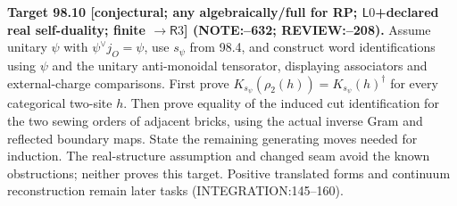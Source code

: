 \textbf{Target 98.10 [conjectural; any algebraically/full for RP; \(\mathsf L0\)+declared real self-duality; finite \(\to\mathsf R3\)] (NOTE:--632; REVIEW:--208).}
Assume unitary \(\psi\) with \(\psi^\vee j_O=\psi\), use \(s_\psi\) from 98.4, and construct word identifications
using \(\psi\) and the unitary anti-monoidal tensorator, displaying associators and external-charge comparisons.
First prove \(K_{s_\psi}(\rho_2(h))=K_{s_\psi}(h)^\dagger\) for every categorical two-site \(h\).
Then prove equality of the induced cut identification for the two sewing orders of adjacent bricks, using
the actual inverse Gram and reflected boundary maps. State the remaining generating moves needed for induction.
The real-structure assumption and changed seam avoid the known obstructions; neither proves this target.
Positive translated forms and continuum reconstruction remain later tasks (INTEGRATION:145--160).
